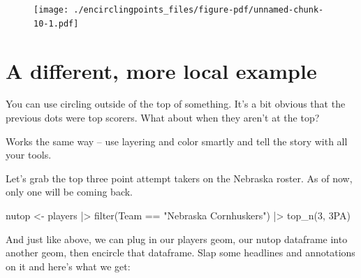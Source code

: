 \documentclass[
  letterpaper,
  DIV=11,
  numbers=noendperiod]{scrreprt}
\newenvironment{Shaded}{\begin{snugshade}}{\end{snugshade}}
\newcommand{\AttributeTok}[1]{\textcolor[rgb]{0.40,0.45,0.13}{#1}}
\newcommand{\DecValTok}[1]{\textcolor[rgb]{0.68,0.00,0.00}{#1}}
\newcommand{\FunctionTok}[1]{\textcolor[rgb]{0.28,0.35,0.67}{#1}}
\newcommand{\NormalTok}[1]{\textcolor[rgb]{0.00,0.23,0.31}{#1}}
\newcommand{\OtherTok}[1]{\textcolor[rgb]{0.00,0.23,0.31}{#1}}
\newcommand{\SpecialCharTok}[1]{\textcolor[rgb]{0.37,0.37,0.37}{#1}}
\newcommand{\StringTok}[1]{\textcolor[rgb]{0.13,0.47,0.30}{#1}}
\begin{document}
\begin{figure}[H]

{\centering \texttt{[image: ./encirclingpoints\_files/figure-pdf/unnamed-chunk-10-1.pdf]}

}

\end{figure}

\hypertarget{a-different-more-local-example}{%
\section{A different, more local
example}\label{a-different-more-local-example}}

You can use circling outside of the top of something. It's a bit obvious
that the previous dots were top scorers. What about when they aren't at
the top?

Works the same way -- use layering and color smartly and tell the story
with all your tools.

Let's grab the top three point attempt takers on the Nebraska roster. As
of now, only one will be coming back.

\begin{Shaded}
\begin{Highlighting}[]
\NormalTok{nutop }\OtherTok{\textless{}{-}}\NormalTok{ players }\SpecialCharTok{|\textgreater{}} \FunctionTok{filter}\NormalTok{(Team }\SpecialCharTok{==} \StringTok{"Nebraska Cornhuskers"}\NormalTok{) }\SpecialCharTok{|\textgreater{}} \FunctionTok{top\_n}\NormalTok{(}\DecValTok{3}\NormalTok{, }\StringTok{\textasciigrave{}}\AttributeTok{3PA}\StringTok{\textasciigrave{}}\NormalTok{)}
\end{Highlighting}
\end{Shaded}

And just like above, we can plug in our players geom, our nutop
dataframe into another geom, then encircle that dataframe. Slap some
headlines and annotations on it and here's what we get:
\end{document}

